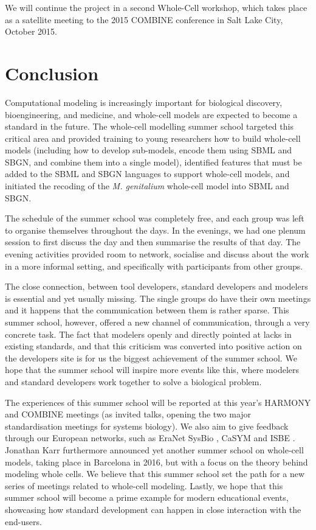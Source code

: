\documentclass[journal,transmag]{IEEEtran}
\begin{document}
We will continue the project in a second Whole-Cell workshop, which takes place as a satellite meeting to the 2015 COMBINE conference in Salt Lake City, October 2015.

\section{Conclusion}
Computational modeling is increasingly important for biological discovery, bioengineering, and medicine, and whole-cell models are expected to become a standard in the future. 
The whole-cell modelling summer school targeted this critical area and  provided  training to young researchers how to build whole-cell models (including how to develop sub-models, encode them using SBML and SBGN, and  combine them into a single model), identified features that must be added to the SBML and SBGN languages to support  whole-cell models, and initiated the recoding of the \textit{M. genitalium} whole-cell model into SBML and SBGN.

The schedule of the summer school was completely free, and each group was left to organise themselves throughout the days.
In the evenings, we had one plenum session to first discuss the day and then summarise the results of that day. 
The evening activities provided room to network, socialise and discuss about the work in a more informal setting, and specifically with participants from other groups. 

The close connection, between tool developers, standard developers and modelers is essential and yet usually missing. 
The single groups do have their own meetings and it happens that the communication between them is rather sparse. 
This summer school, however, offered a new channel of communication, through a very concrete task. 
The fact that modelers openly and directly pointed at lacks in existing standards, and that this criticism was converted into positive action on the developers site is for
us the biggest achievement of the summer school. 
We hope that the summer school will inspire more events like this, where modelers and standard developers work together to solve a biological problem.

The experiences of this summer school will be reported at this year's HARMONY and COMBINE meetings (as invited talks, opening the two major standardisation meetings for
systems biology). 
We also aim to give feedback through our European networks, such as EraNet SysBio \cite{ERASysBio2015}, CaSYM \cite{CaSYM2015} and ISBE \cite{Wolkenhauer2009}.
Jonathan Karr furthermore announced yet another summer school on whole-cell models, taking place in Barcelona in 2016, but with a focus on the theory behind modeling whole cells.
We believe that this summer school set the path for a new series of meetings related to whole-cell modeling.
Lastly, we hope that this summer school will become a prime example for modern educational events, showcasing how standard development can happen in close interaction with the end-users.
\end{document}
